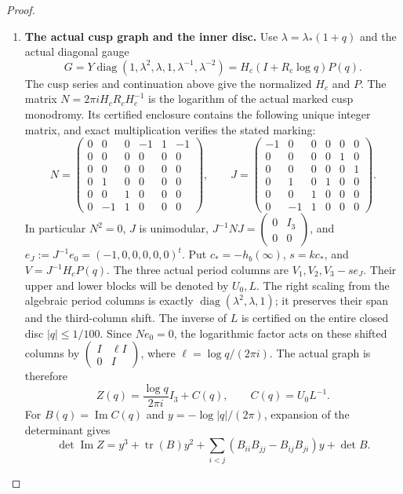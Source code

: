 \documentclass[11pt,a4paper]{article}
\theoremstyle{definition}
\begin{document}
\begin{proof}
\begin{enumerate}[label=\arabic*.]
\item \textbf{The actual cusp graph and the inner disc.}
Use $\lambda=\lambda_*(1+q)$ and the actual diagonal gauge
\[
 G=Y\operatorname{diag}(1,\lambda^2,\lambda,1,
                         \lambda^{-1},\lambda^{-2})
   =H_c(I+R_c\log q)P(q).
\]
The cusp series and continuation above give the normalized
$H_c$ and $P$. The matrix $N=2\pi iH_cR_cH_c^{-1}$ is the
logarithm of the actual marked cusp monodromy. Its certified
enclosure contains the following unique integer matrix, and
exact multiplication verifies the stated marking:
\[
 N=\begin{pmatrix}
 0&0&0&-1&1&-1\\0&0&0&0&0&0\\0&0&0&0&0&0\\
 0&1&0&0&0&0\\0&0&1&0&0&0\\0&-1&1&0&0&0
 \end{pmatrix},\qquad
 J=\begin{pmatrix}
 -1&0&0&0&0&0\\0&0&0&0&1&0\\0&0&0&0&0&1\\
 0&1&0&1&0&0\\0&0&1&0&0&0\\0&-1&1&0&0&0
 \end{pmatrix}.
\]
In particular $N^2=0$, $J$ is unimodular,
$J^{-1}NJ=\left(\begin{smallmatrix}0&I_3\\0&0\end{smallmatrix}\right)$,
and $e_J:=J^{-1}e_0=(-1,0,0,0,0,0)^t$.
Put $c_*=-h_b(\infty)$, $s=kc_*$, and $V=J^{-1}H_cP(q)$.
The three actual period columns are
$V_1,V_2,V_3-se_J$. Their upper and lower blocks will be
denoted by $U_0,L$. The right scaling from the algebraic period
columns is exactly $\operatorname{diag}(\lambda^2,\lambda,1)$;
it preserves their span and the third-column shift.
The inverse of $L$ is certified on the entire closed disc
$|q|\le1/100$.
Since $Ne_0=0$, the logarithmic factor acts on these shifted
columns by
$\left(\begin{smallmatrix}I&\ell I\\0&I\end{smallmatrix}\right)$,
where $\ell=\log q/(2\pi i)$. The actual graph is therefore
\[
 Z(q)=\frac{\log q}{2\pi i}I_3+C(q),\qquad C(q)=U_0L^{-1}.
\]
For $B(q)=\operatorname{Im}C(q)$ and
$y=-\log|q|/(2\pi)$, expansion of the determinant gives
\[
 \det\operatorname{Im}Z
 =y^3+\operatorname{tr}(B)y^2
  +\sum_{i<j}(B_{ii}B_{jj}-B_{ij}B_{ji})y+\det B.
\]
\end{enumerate}
\end{proof}
\end{document}
